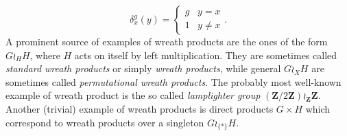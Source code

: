 \documentclass[a4paper]{article}
\theoremstyle{definition}
\newcommand*{\field}[1]{\mathbf{#1}}
\newcommand*{\Z}{\field{Z}}
\begin{document}
\begin{equation*}
\delta_x^g (y) =
\begin{cases}
g & y = x \\
1 & y \neq x
\end{cases}.
\end{equation*}
A prominent  source of examples of wreath products are the ones of the form $G\wr_HH$, where $H$ acts on itself by left multiplication.
They are sometimes called \emph{standard wreath products} or simply \emph{wreath products}, while general $G\wr_XH$ are sometimes called \emph{permutational wreath products}.
The probably most well-known example of wreath product is the so called \emph{lamplighter group} $(\Z/2\Z)\wr_\Z\Z$.
Another (trivial) example of wreath products is direct products $G\times H$ which correspond to wreath products over a singleton $G\wr_{\{*\}}H$.

%
%
%
%
%
%
%
%
%
%
\end{document}
